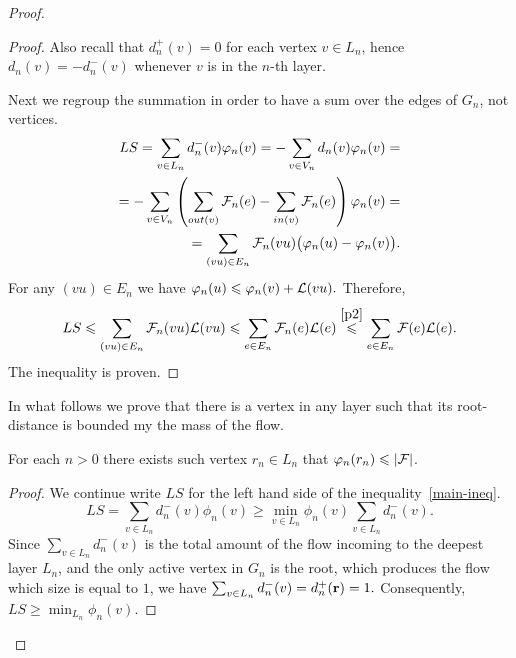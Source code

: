 \documentclass[12pt]{amsart}
\begin{document}
\begin{proof}
\begin{proof}
          Also recall that $d_n^{+}(v) = 0$ for each vertex $v \in L_n$, hence $d_n(v) = -d_n^{-}(v)$ whenever $v$ is in the $n$-th layer.

          Next we regroup the summation in order to have a sum over the edges of $G_n$, not vertices.
          \begin{align*}
            LS = \sum\limits_{v \in L_n} d_n^{-}(v) \varphi_n(v) = -\sum\limits_{v \in V_n} d_n(v) \varphi_n(v) =\\
            =-\sum_{v \in V_n} \left(\sum_{out(v)} \mathcal{F}_{n}(e) - \sum_{in(v)}\mathcal{F}_{n}(e) \right) \varphi_n(v)=\\
            =\sum_{(vu) \in E_n} \mathcal{F}_{n}(vu) \big(\varphi_n(u) - \varphi_n(v)\big).
          \end{align*}
          For any $(vu) \in E_n$ we have $\varphi_n(u) \leqslant \varphi_n(v) + \mathcal{L}(vu).$ Therefore,
          \[
            LS\leqslant\sum_{(vu) \in E_n} \mathcal{F}_{n}(vu) \mathcal{L}(vu)\leqslant \sum_{e \in E_n} \mathcal{F}_{n}(e) \mathcal{L}(e) \overset{\ref{p2}}{\leqslant} \sum_{e \in E_n} \mathcal{F}(e) \mathcal{L}(e).
          \]
          The inequality is proven.
        \end{proof}

        In what follows we prove that there is a vertex in any layer such that its root-distance is bounded my the mass of the flow.
        \begin{prop}
          For each $n > 0$ there exists such vertex $r_n \in L_n$ that $\varphi_n(r_n) \leqslant \lvert\mathcal{F}\rvert$.
        \end{prop}
        \begin{proof}
          We continue write $LS$ for the left hand side of the inequality~\eqref{main-ineq}.
          \[
            LS = \sum_{v \in L_n}d^{-}_n(v) \phi_n(v) \geq \min_{v \in L_n}\phi_n(v) \sum_{v \in L_n} d^{-}_n(v).
          \]
          Since $\sum_{v \in L_n} d^{-}_n(v)$ is the total amount of the flow incoming to the deepest layer $L_n$, and the only
            active vertex in $G_n$ is the root, which produces the flow which size is equal to $1$, we have $\sum_{v \in L_n} d^{-}_n(v) = d^{+}_n(\mathbf{r}) = 1.$
          Consequently, $LS \geq \min_{L_n} \phi_n(v).$


\end{proof}
\end{proof}
\end{document}
